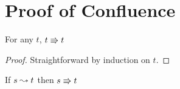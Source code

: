 \chapter{Proof of Confluence}
\label{ap:a}




\begin{lemma}
    For any $t$, $t \Rrightarrow t$
    \label{lem:a:par_refl}
\end{lemma}
\begin{proof}
    Straightforward by induction on $t$.
\end{proof}

\begin{lemma}
    If $s \leadsto t$ then $s \Rrightarrow t$
    \label{lem:a:beta_implies_par_step}
\end{lemma}
